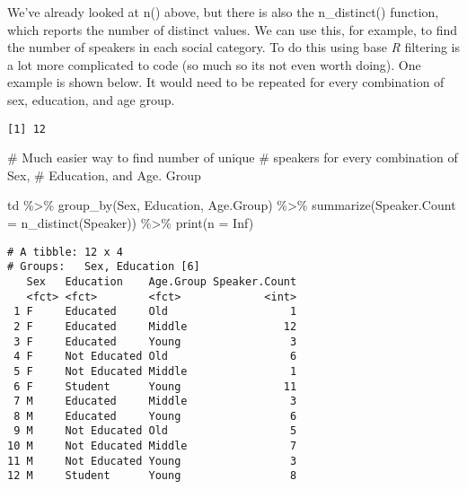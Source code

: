 \documentclass[
  12pt,
  letterpaper]{article}
\newenvironment{Shaded}{\begin{snugshade}}{\end{snugshade}}
\newcommand{\AttributeTok}[1]{\textcolor[rgb]{0.40,0.45,0.13}{#1}}
\newcommand{\CommentTok}[1]{\textcolor[rgb]{0.37,0.37,0.37}{#1}}
\newcommand{\ConstantTok}[1]{\textcolor[rgb]{0.56,0.35,0.01}{#1}}
\newcommand{\FunctionTok}[1]{\textcolor[rgb]{0.28,0.35,0.67}{#1}}
\newcommand{\NormalTok}[1]{\textcolor[rgb]{0.00,0.23,0.31}{#1}}
\newcommand{\SpecialCharTok}[1]{\textcolor[rgb]{0.37,0.37,0.37}{#1}}
\newcommand{\StringTok}[1]{\textcolor[rgb]{0.13,0.47,0.30}{#1}}
\renewcommand\texttt[1]{{\ttfamily\color{BrickRed}#1}}
\begin{document}
We've already looked at \texttt{n()} above, but there is also the
\texttt{n\_distinct()} function, which reports the number of distinct
values. We can use this, for example, to find the number of speakers in
each social category. To do this using base \emph{R} filtering is a lot
more complicated to code (so much so its not even worth doing). One
example is shown below. It would need to be repeated for every
combination of sex, education, and age group.

\begin{Shaded}
\end{Shaded}

\begin{verbatim}
[1] 12
\end{verbatim}

\begin{Shaded}
\begin{Highlighting}[]
\CommentTok{\# Much easier way to find number of unique}
\CommentTok{\# speakers for every combination of Sex,}
\CommentTok{\# Education, and Age. Group}

\NormalTok{td }\SpecialCharTok{\%\textgreater{}\%}
    \FunctionTok{group\_by}\NormalTok{(Sex, Education, Age.Group) }\SpecialCharTok{\%\textgreater{}\%}
    \FunctionTok{summarize}\NormalTok{(}\AttributeTok{Speaker.Count =} \FunctionTok{n\_distinct}\NormalTok{(Speaker)) }\SpecialCharTok{\%\textgreater{}\%}
    \FunctionTok{print}\NormalTok{(}\AttributeTok{n =} \ConstantTok{Inf}\NormalTok{)}
\end{Highlighting}
\end{Shaded}

\begin{verbatim}
# A tibble: 12 x 4
# Groups:   Sex, Education [6]
   Sex   Education    Age.Group Speaker.Count
   <fct> <fct>        <fct>             <int>
 1 F     Educated     Old                   1
 2 F     Educated     Middle               12
 3 F     Educated     Young                 3
 4 F     Not Educated Old                   6
 5 F     Not Educated Middle                1
 6 F     Student      Young                11
 7 M     Educated     Middle                3
 8 M     Educated     Young                 6
 9 M     Not Educated Old                   5
10 M     Not Educated Middle                7
11 M     Not Educated Young                 3
12 M     Student      Young                 8
\end{verbatim}
\end{document}
